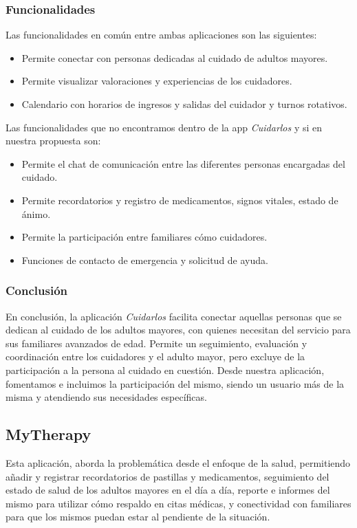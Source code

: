 \documentclass[a4paper,12pt]{article}
\begin{document}
    \subsubsection{Funcionalidades}
    Las funcionalidades en común entre ambas aplicaciones son las siguientes:
    \begin{itemize}
        \item Permite conectar con personas dedicadas al cuidado de adultos mayores.
        \item Permite visualizar valoraciones y experiencias de los cuidadores.
        \item Calendario con horarios de ingresos y salidas del cuidador y turnos rotativos.
    \end{itemize}
    Las funcionalidades que no encontramos dentro de la app \textit{Cuidarlos} y si en nuestra propuesta son:
    \begin{itemize}
        \item Permite el chat de comunicación entre las diferentes personas encargadas del cuidado.
        \item Permite recordatorios y registro de medicamentos, signos vitales, estado de ánimo.
        \item Permite la participación entre familiares cómo cuidadores.
        \item Funciones de contacto de emergencia y solicitud de ayuda.
    \end{itemize}
    \subsubsection{Conclusión}
    En conclusión, la aplicación \textit{Cuidarlos} facilita conectar aquellas personas que se dedican al cuidado de los adultos mayores, con quienes necesitan del servicio para sus familiares avanzados de edad. Permite un seguimiento, evaluación y coordinación entre los cuidadores y el adulto mayor, pero excluye de la participación a la persona al cuidado en cuestión. Desde nuestra aplicación, fomentamos e incluimos la participación del mismo, siendo un usuario más de la misma y atendiendo sus necesidades específicas.
    \subsection{MyTherapy}
    Esta aplicación, aborda la problemática desde el enfoque de la salud, permitiendo añadir y registrar recordatorios de pastillas y medicamentos, seguimiento del estado de salud de los adultos mayores en el día a día, reporte e informes del mismo para utilizar cómo respaldo en citas médicas, y conectividad con familiares para que los mismos puedan estar al pendiente de la situación.
\end{document}
